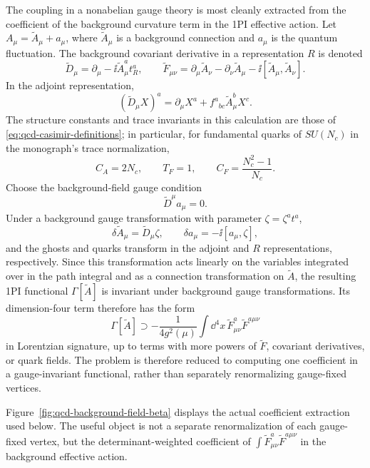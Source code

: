 The coupling in a nonabelian gauge theory is most cleanly extracted from the
coefficient of the background curvature term in the 1PI effective action.  Let
\(A_\mu=\widetilde A_\mu+a_\mu\), where \(\widetilde A_\mu\) is a background
connection and \(a_\mu\) is the quantum fluctuation.  The background covariant
derivative in a representation \(R\) is denoted
\[
  \widetilde D_\mu=\partial_\mu-\ii \widetilde A_\mu^a t_R^a ,
  \qquad
  \widetilde F_{\mu\nu}
  =
  \partial_\mu\widetilde A_\nu-\partial_\nu\widetilde A_\mu
  -\ii[\widetilde A_\mu,\widetilde A_\nu].
\]
In the adjoint representation,
\[
  (\widetilde D_\mu X)^a
  =
  \partial_\mu X^a+f^a{}_{bc}\widetilde A_\mu^bX^c .
\]
The structure constants and trace invariants in this calculation are those of
\eqref{eq:qcd-casimir-definitions}; in particular, for fundamental quarks of
\(SU(N_c)\) in the monograph's trace normalization,
\[
  C_A=2N_c,\qquad T_F=1,\qquad C_F=\frac{N_c^2-1}{N_c}.
\]
Choose the background-field gauge condition
\[
  \widetilde D^\mu a_\mu=0 .
\]
Under a background gauge transformation with parameter
\(\zeta=\zeta^a t^a\),
\[
  \delta \widetilde A_\mu=\widetilde D_\mu\zeta,\qquad
  \delta a_\mu=-\ii[a_\mu,\zeta],
\]
and the ghosts and quarks transform in the adjoint and \(R\) representations,
respectively.  Since this transformation acts linearly on the variables
integrated over in the path integral and as a connection transformation on
\(\widetilde A\), the resulting 1PI functional
\(\Gamma[\widetilde A]\) is invariant under background gauge transformations.
Its dimension-four term therefore has the form
\begin{equation}
  \Gamma[\widetilde A]
  \supset
  -\frac1{4g^2(\mu)}
  \int\dd^4x\,
  \widetilde F^a_{\mu\nu}\widetilde F^{a\mu\nu}
  \label{eq:qcd-background-effective-coupling}
\end{equation}
in Lorentzian signature, up to terms with more powers of
\(\widetilde F\), covariant derivatives, or quark fields.  The problem is
therefore reduced to computing one coefficient in a gauge-invariant
functional, rather than separately renormalizing gauge-fixed vertices.

Figure~\ref{fig:qcd-background-field-beta} displays the actual coefficient
extraction used below.  The useful object is not a separate renormalization of
each gauge-fixed vertex, but the determinant-weighted coefficient of
\(\int\widetilde F_{\mu\nu}^a\widetilde F^{a\mu\nu}\) in the background
effective action.

